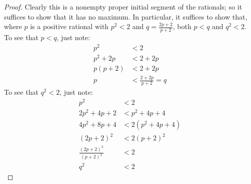 \documentclass[../../../include/open-logic-section]{subfiles}
\begin{document}
\begin{proof}
Clearly this is a nonempty proper initial segment of the rationals; so
it suffices to show that it has no maximum. In particular, it suffices
to show that, where $p$ is a positive rational with $p^2 < 2$ and $q =
\frac{2p+2}{p+2}$, both $p < q$ and $q^2 < 2$. To see that $p < q$,
just note:
\begin{align*}
	p^2 &< 2\\
	p^2 + 2p &< 2 + 2p\\
	p(p + 2) &< 2 + 2p\\
	p &< \tfrac{2+2p}{p+2} = q
\end{align*}
To see that $q^2 < 2$, just note:
\begin{align*}
	p^2 &< 2\\
	2p^2 + 4p + 2 &< p^2 + 4p+ 4\\
	4p^2 + 8p + 4 &< 2(p^2 + 4p + 4)\\
	(2p+2)^2 & <2(p+2)^2\\
	\tfrac{(2p+2)^2}{(p+2)^2} &< 2\\
	q^2 &< 2
\end{align*}
\end{proof}
\end{document}
